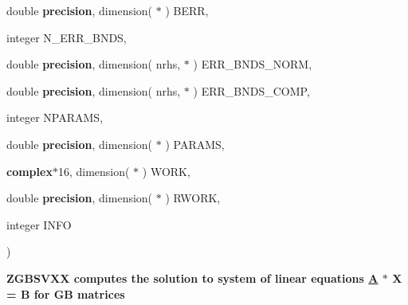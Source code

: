 {\begin{DoxyParamCaption}
\item[{double {\bf precision}, dimension( $\ast$ )}]{B\+E\+R\+R, }
\item[{integer}]{N\+\_\+\+E\+R\+R\+\_\+\+B\+N\+D\+S, }
\item[{double {\bf precision}, dimension( nrhs, $\ast$ )}]{E\+R\+R\+\_\+\+B\+N\+D\+S\+\_\+\+N\+O\+R\+M, }
\item[{double {\bf precision}, dimension( nrhs, $\ast$ )}]{E\+R\+R\+\_\+\+B\+N\+D\+S\+\_\+\+C\+O\+M\+P, }
\item[{integer}]{N\+P\+A\+R\+A\+M\+S, }
\item[{double {\bf precision}, dimension( $\ast$ )}]{P\+A\+R\+A\+M\+S, }
\item[{{\bf complex}$\ast$16, dimension( $\ast$ )}]{W\+O\+R\+K, }
\item[{double {\bf precision}, dimension( $\ast$ )}]{R\+W\+O\+R\+K, }
\item[{integer}]{I\+N\+F\+O}
\end{DoxyParamCaption}
)}\label{group__complex16GBsolve_gad0be5b79eba27d25c57e5a605bf4d730}


{\bfseries  Z\+G\+B\+S\+V\+X\+X computes the solution to system of linear equations \hyperlink{classA}{A} $\ast$ X = B for G\+B matrices} 

